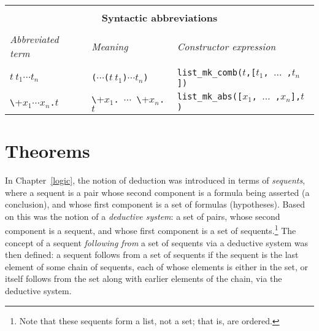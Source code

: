 \begin{center}

\begin{tabular}{|l|l|l|} \hline
\multicolumn{3}{|c|}{ } \\
\multicolumn{3}{|c|}{\bf Syntactic abbreviations} \\
\multicolumn{3}{|c|}{ } \\
{\it Abbreviated term} & {\it Meaning} &
{\it Constructor expression} \\ \hline
 & &  \\
$t\ t_1 \cdots t_n$ &
{\small\verb+(+}$\cdots${\small\verb+(+}$t\ t_1${\small\verb+)+}$\cdots t_n${\small\verb+)+} &
{\small\verb+list_mk_comb(+}$t${\small\verb+,[+}$t_1${\small\verb+, +}$\ldots${\small\verb+ ,+}$t_n${\small\verb+])+} \\ \hline
{\small\verb+\+}$x_1\cdots x_n${\small\verb+.+}$t$ &
{\small\verb+\+}$x_1${\small\verb+. +}$\cdots${\small\verb+ \+}$x_n${\small\verb+.+}$t$ &
{\small\verb+list_mk_abs([+}$x_1${\small\verb+, +}$\ldots${\small\verb+ ,+}$x_n${\small\verb+],+}$t${\small\verb+)+}
\\ \hline
\end{tabular}
\end{center}


\section{Theorems}
\label{sec:theorems-in-ml}

In Chapter~\ref{logic}, the notion of deduction was introduced in
terms of \textit{sequents}, where
a sequent is a pair whose second component is a formula being asserted
(a conclusion), and whose first
component is a set of formulas (hypotheses).  Based on this was the notion of a \textit{deductive
  system}: a set of
pairs, whose second component is a sequent, and whose first component
is a set of sequents.\footnote{Note that these sequents form a list,
  not a set; that is, are ordered.}  The concept of a sequent
\textit{following from} a
set of sequents via a deductive system was then defined: a sequent
follows from a set of sequents if the sequent is the last element of
some chain of sequents, each of whose elements is either in the set,
or itself follows from the set along with earlier elements of the
chain, via the deductive system.

